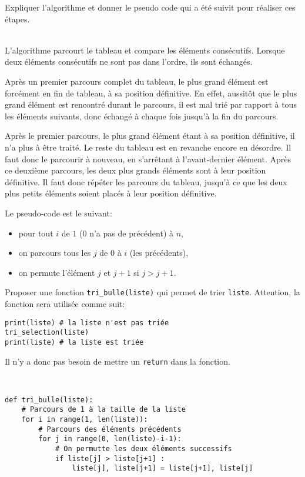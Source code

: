 \begin{exercice}
Expliquer l'algorithme et donner le pseudo code qui a été suivit pour réaliser ces étapes.
\end{exercice}

\begin{solution}~\\
L'algorithme parcourt le tableau et compare les éléments consécutifs. Lorsque deux éléments consécutifs ne sont pas dans l'ordre, ils sont échangés.

Après un premier parcours complet du tableau, le plus grand élément est forcément en fin de tableau, à sa position définitive. En effet, aussitôt que le plus grand élément est rencontré durant le parcours, il est mal trié par rapport à tous les éléments suivants, donc échangé à chaque fois jusqu'à la fin du parcours.

Après le premier parcours, le plus grand élément étant à sa position définitive, il n'a plus à être traité. Le reste du tableau est en revanche encore en désordre. Il faut donc le parcourir à nouveau, en s'arrêtant à l'avant-dernier élément. Après ce deuxième parcours, les deux plus grands éléments sont à leur position définitive. Il faut donc répéter les parcours du tableau, jusqu'à ce que les deux plus petits éléments soient placés à leur position définitive.

Le pseudo-code est le suivant:
\begin{itemize}
 \item pour tout $i$ de $1$ ($0$ n'a pas de précédent) à $n$,
 \item on parcours tous les $j$ de $0$ à $i$ (les précédents),
 \item on permute l'élément $j$ et $j+1$ si $j>j+1$.
\end{itemize}
\end{solution}

\begin{exercice}
Proposer une fonction \verb?tri_bulle(liste)? qui permet de trier \verb?liste?. Attention, la fonction sera utilisée comme suit:
\begin{verbatim}
print(liste) # la liste n'est pas triée
tri_selection(liste)
print(liste) # la liste est triée
\end{verbatim}

Il n'y a donc pas besoin de mettre un \verb?return? dans la fonction.
\end{exercice}

\begin{solution}~\\
\vspace{-0.7cm}
\begin{verbatim}
def tri_bulle(liste):
    # Parcours de 1 à la taille de la liste
    for i in range(1, len(liste)):
        # Parcours des éléments précédents
        for j in range(0, len(liste)-i-1):
            # On permutte les deux éléments successifs
            if liste[j] > liste[j+1] :
                liste[j], liste[j+1] = liste[j+1], liste[j]
\end{verbatim}    
\end{solution}

